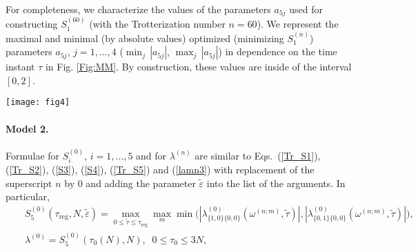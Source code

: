 \documentclass[pra,preprint,showpacs]{revtex4-1}
\begin{document}
{{For completeness, we characterize the values of the parameters $a_{5j}$ used for  constructing $S_1^{(60)}$ (with the Trotterization number $n=60$). We represent the maximal and minimal (by  absolute values) optimized ({minimizing}  $S_1^{(n)}$) parameters $a_{5j}$, $j=1,\dots,4$
($\min_j\, |a_{5j}|$, $\max_j\, |a_{5j}|$)  in dependence on the time instant $\tau$ in Fig. \ref{Fig:MM}. By construction, these values are inside of the interval $[0,2]$.

\begin{figure*}[!]
\centering
\texttt{[image: fig4]}
\caption{The maximal (upper curve) and minimal (lower curve) values of $a_{5j}$, $j=1,\dots,4$ obtained in constructing $S_1^{(60)}$. Here $N=6$, $N^{(S)}=N^{(R)}=2$.
}
\label{Fig:MM}
\end{figure*}



\paragraph{Model 2.}
\label{Section:M2}

Formulae for $S^{(0)}_{i}$, $i=1,\dots,5$ and for $\lambda^{(n)}$
are similar to Eqs.~(\ref{Tr_S1}), (\ref{Tr_S2}), (\ref{S3}), (\ref{S4}), (\ref{Tr_S5}) and (\ref{lamn3}) with replacement
of the superscript $n$ by 0 and adding the parameter
$\tilde \varepsilon$ into the list of the arguments.
In particular,
\begin{eqnarray}\label{Tr_S52}
&&
S^{(0)}_5(\tau_{\mathrm{reg}},N,\tilde \varepsilon)=\max_{0\le\tilde\tau\le\tau_{\mathrm{reg}}}\max_m \min\Big(\left|\lambda^{(0)}_{\{1,0\}\{0,0\}}(\omega^{(n;m)},\tilde \tau)\right|,
\left|\lambda^{(0)}_{\{0,1\}\{0,0\}}(\omega^{(n;m)},\tilde \tau)\right|\Big),\\\label{lamn32}
&&
\lambda^{(0)}= S^{(0)}_5(\tau_0(N),N),\;\; 0\le\tau_0\le 3 N,
\end{eqnarray}

}}
\end{document}
